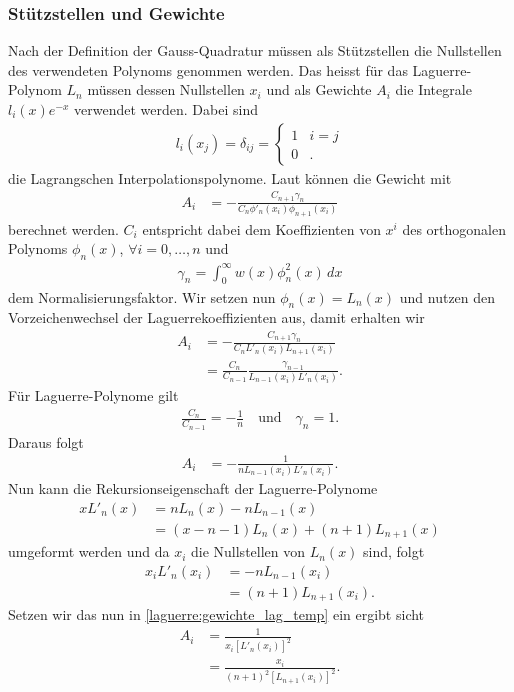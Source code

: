 \subsubsection{Stützstellen und Gewichte}
Nach der Definition der Gauss-Quadratur müssen als Stützstellen die Nullstellen
des verwendeten Polynoms genommen werden.
Das heisst für das Laguerre-Polynom $L_n$ müssen dessen Nullstellen $x_i$ und
als Gewichte $A_i$ die Integrale $l_i(x)e^{-x}$ verwendet werden.
Dabei sind
\begin{align*}
l_i(x_j)
=
\delta_{ij}
=
\begin{cases}
1 & i=j      \\
0 & \text{.}
\end{cases}
\end{align*}
die Lagrangschen Interpolationspolynome.
Laut \cite{hildebrand2013introduction} können die Gewicht mit
\begin{align*}
A_i
 & =
-\frac{C_{n+1} \gamma_n}{C_n \phi'_n(x_i) \phi_{n+1} (x_i)}
\end{align*}
berechnet werden.
$C_i$ entspricht dabei dem Koeffizienten von $x^i$
des orthogonalen Polynoms $\phi_n(x)$, $\forall i =0,\ldots,n$ und
\begin{align*}
\gamma_n
=
\int_0^\infty w(x) \phi_n^2(x)\,dx
\end{align*}
dem Normalisierungsfaktor.
Wir setzen nun $\phi_n(x) = L_n(x)$ und
nutzen den Vorzeichenwechsel der Laguerrekoeffizienten aus,
damit erhalten wir
\begin{align*}
A_i
 & =
-\frac{C_{n+1} \gamma_n}{C_n L'_n(x_i) L_{n+1} (x_i)}
\\
 & = \frac{C_n}{C_{n-1}} \frac{\gamma_{n-1}}{L_{n-1}(x_i) L'_n(x_i)}
.
\end{align*}
Für Laguerre-Polynome gilt
\begin{align*}
\frac{C_n}{C_{n-1}}
=
-\frac{1}{n}
\quad \text{und} \quad
\gamma_n
=
1
.
\end{align*}
Daraus folgt
\begin{align}
A_i
&=
- \frac{1}{n L_{n-1}(x_i) L'_n(x_i)}
.
\label{laguerre:gewichte_lag_temp}
\end{align}
Nun kann die Rekursionseigenschaft der Laguerre-Polynome
\begin{align*}
x L'_n(x) 
&= 
n L_n(x) - n L_{n-1}(x)
\\
&= (x - n - 1) L_n(x) + (n + 1) L_{n+1}(x)
\end{align*}
umgeformt werden und da $x_i$ die Nullstellen von $L_n(x)$ sind,
folgt
\begin{align*}
x_i L'_n(x_i)
&=
- n L_{n-1}(x_i) 
\\
&=
 (n + 1) L_{n+1}(x_i)
.
\end{align*}
Setzen wir das nun in \eqref{laguerre:gewichte_lag_temp} ein ergibt sicht
\begin{align}
\nonumber
A_i
&=
\frac{1}{x_i \left[ L'_n(x_i) \right]^2}
\\
&=
\frac{x_i}{(n+1)^2 \left[ L_{n+1}(x_i) \right]^2}
.
\label{laguerre:quadratur_gewichte}
\end{align}


